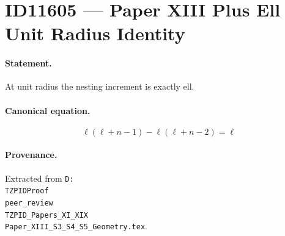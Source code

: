 \section*{ID11605 --- Paper XIII Plus Ell Unit Radius Identity}

\paragraph{Statement.}
At unit radius the nesting increment is exactly ell.

\paragraph{Canonical equation.}
\[
\ell(\ell+n-1)-\ell(\ell+n-2)=\ell
\]

\paragraph{Provenance.}
Extracted from \texttt{D:\\TZPIDProof\\peer\_review\\TZPID\_Papers\_XI\_XIX\\Paper\_XIII\_S3\_S4\_S5\_Geometry.tex}.
